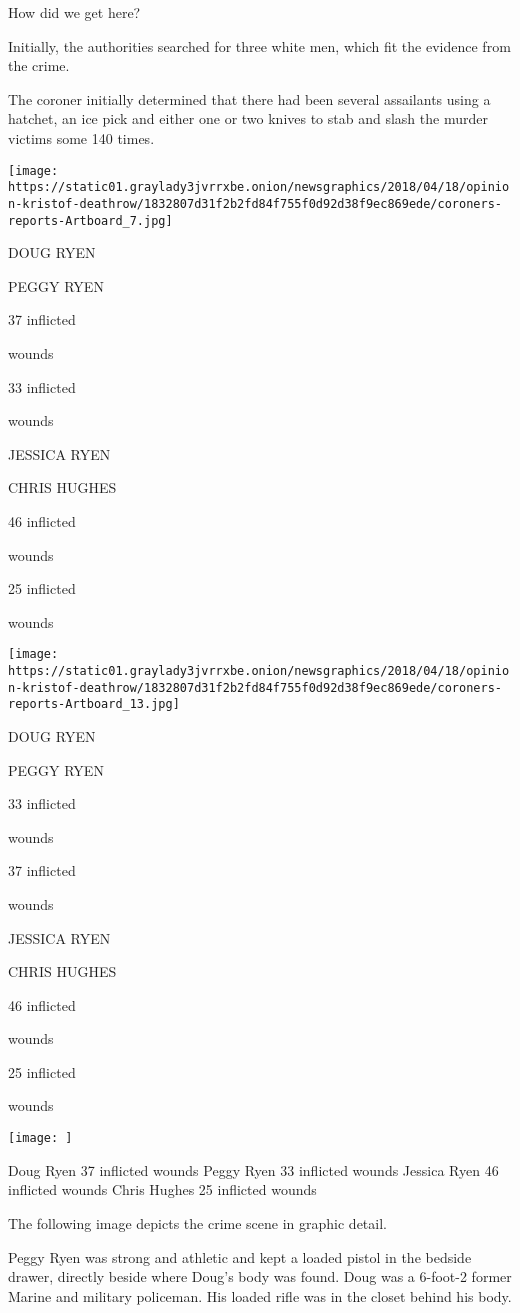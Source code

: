How did we get here?

Initially, the authorities searched for three white men, which fit the
evidence from the crime.

The coroner initially determined that there had been several assailants
using a hatchet, an ice pick and either one or two knives to stab and
slash the murder victims some 140 times.

\texttt{[image: https://static01.graylady3jvrrxbe.onion/newsgraphics/2018/04/18/opinion-kristof-deathrow/1832807d31f2b2fd84f755f0d92d38f9ec869ede/coroners-reports-Artboard\_7.jpg]}

DOUG RYEN

PEGGY RYEN

37 inflicted

wounds

33 inflicted

wounds

JESSICA RYEN

CHRIS HUGHES

46 inflicted

wounds

25 inflicted

wounds

\texttt{[image: https://static01.graylady3jvrrxbe.onion/newsgraphics/2018/04/18/opinion-kristof-deathrow/1832807d31f2b2fd84f755f0d92d38f9ec869ede/coroners-reports-Artboard\_13.jpg]}

DOUG RYEN

PEGGY RYEN

33 inflicted

wounds

37 inflicted

wounds

JESSICA RYEN

CHRIS HUGHES

46 inflicted

wounds

25 inflicted

wounds

\texttt{[image: ]}

Doug Ryen 37 inflicted wounds Peggy Ryen 33 inflicted wounds Jessica
Ryen 46 inflicted wounds Chris Hughes 25 inflicted wounds

 The following image depicts the crime scene in graphic detail.

Peggy Ryen was strong and athletic and kept a loaded pistol in the
bedside drawer, directly beside where Doug's body was found. Doug was a
6-foot-2 former Marine and military policeman. His loaded rifle was in
the closet behind his body.

